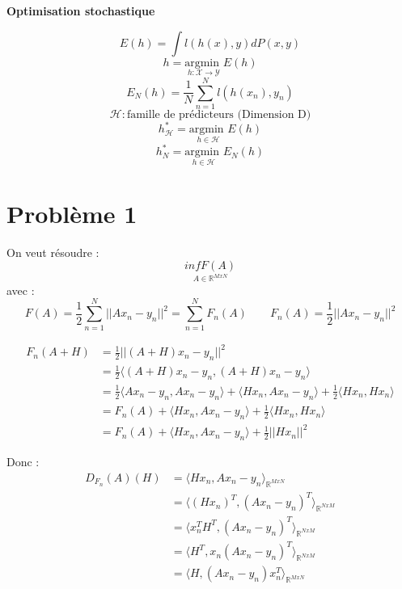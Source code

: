\documentclass[12pt,a4paper]{article}
\begin{document}
\begin{center}
    \textbf{Optimisation stochastique}\\
\end{center}

\tableofcontents


$$
E(h) = \int{l(h(x), y) dP(x, y)}
$$
$$
h = \underset{h : \mathcal{X} \rightarrow \mathcal{Y}}{\text{argmin }} E(h)
$$
$$
E_N(h) = \frac{1}{N} \sum_{n=1}^N l(h(x_n), y_n)
$$
$$
\mathcal{H} : \text{famille de prédicteurs (Dimension D)}
$$
$$
h_{\mathcal{H}}^* = \underset{h \in \mathcal{H}}{\text{argmin }} E(h)
$$
$$
h_{N}^* = \underset{h \in \mathcal{H}}{\text{argmin }} E_N(h)
$$


\section{Problème 1}
On veut résoudre :
\begin{equation}
    \underset{A \in \mathbb{R}^{MxN}}{inf F(A)}
\end{equation}
avec :
$$
F(A)  = \frac{1}{2}\sum_{n=1}^N ||Ax_n - y_n ||^2 = \sum_{n=1}^N F_n(A)
\quad \quad F_n(A) = \frac{1}{2}||Ax_n - y_n ||^2
$$

\begin{align*}
    F_n(A + H) &= \frac{1}{2}||(A+H)x_n - y_n ||^2\\
    &= \frac{1}{2}\langle (A+H)x_n - y_n, (A+H)x_n - y_n \rangle\\
    &= \frac{1}{2}\langle Ax_n - y_n, Ax_n - y_n \rangle + \langle Hx_n, Ax_n - y_n \rangle + \frac{1}{2}\langle Hx_n, Hx_n \rangle\\
    &= F_n(A) + \langle Hx_n, Ax_n - y_n \rangle + \frac{1}{2}\langle Hx_n, Hx_n \rangle\\
    &= F_n(A) + \langle Hx_n, Ax_n - y_n \rangle + \frac{1}{2}||Hx_n||^2
\end{align*}

Donc :
\begin{align*}
    D_{F_n}(A)(H) &= \langle Hx_n, Ax_n - y_n \rangle_{\mathbb{R}^{MxN}}\\
    &= \langle (Hx_n)^T, (Ax_n - y_n)^T \rangle_{\mathbb{R}^{NxM}}\\
    &= \langle x_n^T H^T, (Ax_n - y_n)^T \rangle_{\mathbb{R}^{NxM}}\\
    &= \langle H^T, x_n(Ax_n - y_n)^T \rangle_{\mathbb{R}^{NxM}}\\
    &= \langle H, (Ax_n - y_n)x_n^T \rangle_{\mathbb{R}^{MxN}}
\end{align*}
\end{document}
